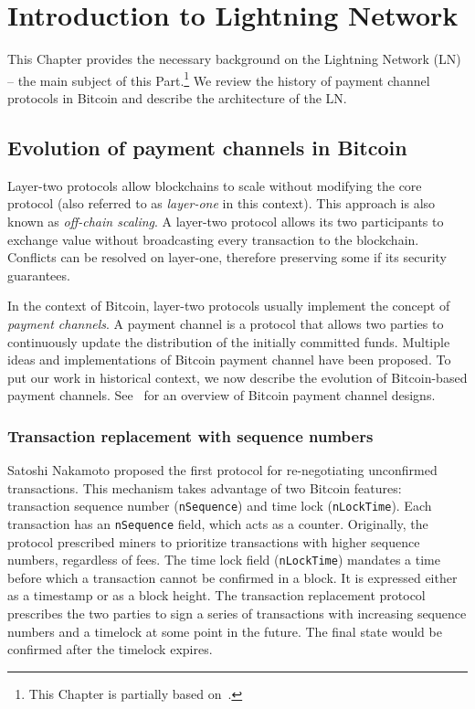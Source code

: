 \chapter{Introduction to Lightning Network}

\label{Chapter05IntroLightning}

This Chapter provides the necessary background on the Lightning Network (LN) -- the main subject of this Part.\footnote{This Chapter is partially based on~\cite{Tikhomirov2020a}.}
We review the history of payment channel protocols in Bitcoin and describe the architecture of the LN.


\section{Evolution of payment channels in Bitcoin}

Layer-two protocols allow blockchains to scale without modifying the core protocol (also referred to as \textit{layer-one} in this context).
This approach is also known as \textit{off-chain scaling}.
A layer-two protocol allows its two participants to exchange value without broadcasting every transaction to the blockchain.
Conflicts can be resolved on layer-one, therefore preserving some if its security guarantees.

In the context of Bitcoin, layer-two protocols usually implement the concept of \textit{payment channels}.
A payment channel is a protocol that allows two parties to continuously update the distribution of the initially committed funds.
Multiple ideas and implementations of Bitcoin payment channel have been proposed.
To put our work in historical context, we now describe the evolution of Bitcoin-based payment channels.
See~\cite{McCorry2016} for an overview of Bitcoin payment channel designs.


\subsection{Transaction replacement with sequence numbers}

Satoshi Nakamoto proposed the first protocol for re-negotiating unconfirmed transactions.
This mechanism takes advantage of two Bitcoin features: transaction sequence number (\texttt{nSequence}) and time lock (\texttt{nLockTime}).
Each transaction has an \texttt{nSequence} field, which acts as a counter.
Originally, the protocol prescribed miners to prioritize transactions with higher sequence numbers, regardless of fees.
The time lock field (\texttt{nLockTime}) mandates a time before which a transaction cannot be confirmed in a block.
It is expressed either as a timestamp or as a block height.
The transaction replacement protocol prescribes the two parties to sign a series of transactions with increasing sequence numbers and a timelock at some point in the future.
The final state would be confirmed after the timelock expires.

